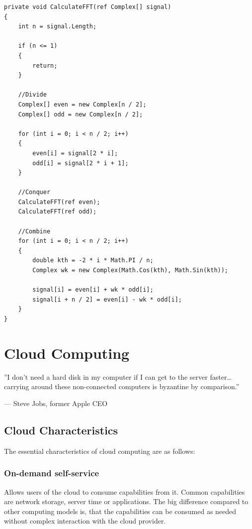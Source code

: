 \begin{lstlisting}[frame=single]
private void CalculateFFT(ref Complex[] signal)
{
	int n = signal.Length;

	if (n <= 1)
	{
		return;
	}

	//Divide
	Complex[] even = new Complex[n / 2];
	Complex[] odd = new Complex[n / 2];

	for (int i = 0; i < n / 2; i++)
	{
		even[i] = signal[2 * i];
		odd[i] = signal[2 * i + 1];
	}

	//Conquer
	CalculateFFT(ref even);
	CalculateFFT(ref odd);

	//Combine
	for (int i = 0; i < n / 2; i++)
	{
		double kth = -2 * i * Math.PI / n;
		Complex wk = new Complex(Math.Cos(kth), Math.Sin(kth));

		signal[i] = even[i] + wk * odd[i];
		signal[i + n / 2] = even[i] - wk * odd[i];
	}
}
\end{lstlisting}

\section{Cloud Computing}

\epigraph{''I don’t need a hard disk in my computer if I can get to the server faster\dots \\ carrying around these non-connected computers is byzantine by comparison.''}{--- \textup{Steve Jobs}, former Apple CEO}

\subsection{Cloud Characteristics}
The essential characteristics of cloud computing are as follows\cite{cloud_characteristics}\cite{nist}:

\subsubsection{On-demand self-service}
Allows users of the cloud to consume capabilities from it. Common capabilities are network storage, server time or applications. The big difference compared to other computing models is, that the capabilities can be consumed as needed without complex interaction with the cloud provider. 

